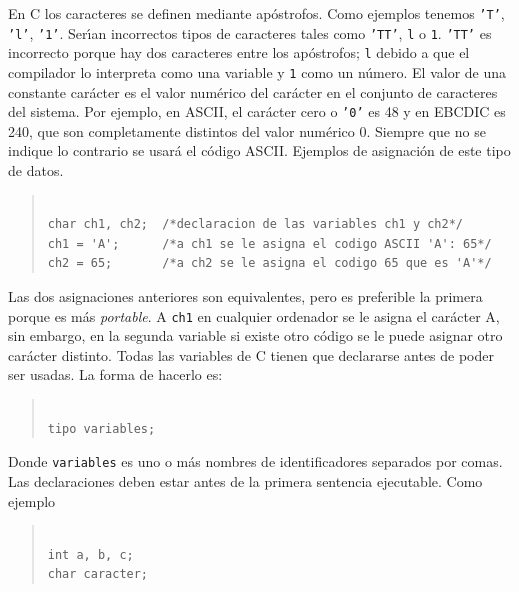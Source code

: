 
En C los caracteres se definen mediante ap\'ostrofos. Como ejemplos tenemos
\texttt{'T'}, \texttt{'l'}, \texttt{'1'}. Ser\'{\i}an incorrectos tipos de 
caracteres tales como \texttt{'TT'}, \texttt{l} o \texttt{1}. \texttt{'TT'} es
incorrecto porque hay dos caracteres entre los ap\'ostrofos; \texttt{l} debido 
a que el compilador lo interpreta como una variable y \texttt{1} como un 
n\'umero. El valor de una constante car\'acter es el valor num\'erico del 
car\'acter  en el conjunto de caracteres del sistema. Por ejemplo, en ASCII,
el car\'acter cero o \texttt{'0'} es 48 y en EBCDIC es 240, que son
 completamente distintos del valor num\'erico 0. Siempre que no se indique lo
contrario se usar\'a el c\'odigo ASCII. Ejemplos de asignaci\'on de este tipo
de datos.

\begin{quotation}
\begin{verbatim}

char ch1, ch2;  /*declaracion de las variables ch1 y ch2*/
ch1 = 'A';      /*a ch1 se le asigna el codigo ASCII 'A': 65*/
ch2 = 65;       /*a ch2 se le asigna el codigo 65 que es 'A'*/

\end{verbatim}
\end{quotation}

Las dos asignaciones anteriores son equivalentes, pero es preferible la
primera porque es m\'as \emph{portable}. A \texttt{ch1} en cualquier
ordenador se le asigna el car\'acter A, sin embargo, en la segunda variable
si existe otro c\'odigo se le puede asignar otro car\'acter distinto. Todas
las variables de C tienen que declararse antes de poder ser usadas. La forma
de hacerlo es:

\begin{quotation}
\begin{verbatim}

tipo variables;

\end{verbatim}
\end{quotation}

Donde \texttt{variables} es uno o m\'as nombres de identificadores separados
por comas. Las declaraciones deben estar antes de la primera sentencia
ejecutable. Como ejemplo

\begin{quotation}
\begin{verbatim}

int a, b, c;
char caracter;

\end{verbatim}
\end{quotation}

